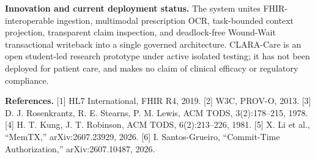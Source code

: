 \documentclass[10pt,letterpaper]{article}
\begin{document}
\textbf{Innovation and current deployment status.} The system unites FHIR-interoperable ingestion, multimodal prescription OCR, task-bounded context projection, transparent claim inspection, and deadlock-free Wound-Wait transactional writeback into a single governed architecture. CLARA-Care is an open student-led research prototype under active isolated testing; it has not been deployed for patient care, and makes no claim of clinical efficacy or regulatory compliance.

\textbf{References.} [1] HL7 International, FHIR R4, 2019. [2] W3C, PROV-O, 2013. [3] D. J. Rosenkrantz, R. E. Stearns, P. M. Lewis, ACM TODS, 3(2):178--215, 1978. [4] H. T. Kung, J. T. Robinson, ACM TODS, 6(2):213--226, 1981. [5] X. Li et al., ``MemTX,'' arXiv:2607.23929, 2026. [6] I. Santos-Grueiro, ``Commit-Time Authorization,'' arXiv:2607.10487, 2026.
\end{document}
